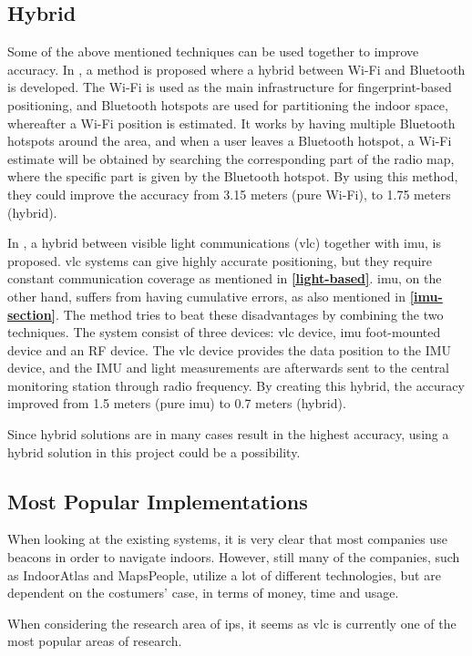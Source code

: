 \subsection{Hybrid}
Some of the above mentioned techniques can be used together to improve accuracy. In \cite{aauhybrid}, a method is proposed where a hybrid between Wi-Fi and Bluetooth is developed. The Wi-Fi is used as the main infrastructure for fingerprint-based positioning, and Bluetooth hotspots are used for partitioning the indoor space, whereafter a Wi-Fi position is estimated. It works by having multiple Bluetooth hotspots around the area, and when a user leaves a Bluetooth hotspot, a Wi-Fi estimate will be obtained by searching the corresponding part of the radio map, where the specific part is given by the Bluetooth hotspot. By using this method, they could improve the accuracy from 3.15 meters (pure Wi-Fi), to 1.75 meters (hybrid).

In \cite{9249516}, a hybrid between visible light communications (\gls{vlc}) together with \gls{imu}, is proposed. \gls{vlc} systems can give highly accurate positioning, but they require constant communication coverage as mentioned in \textbf{\ref{light-based}}. \gls{imu}, on the other hand, suffers from having cumulative errors, as also mentioned in \textbf{\ref{imu-section}}. The method tries to beat these disadvantages by combining the two techniques. The system consist of three devices: \gls{vlc} device, \gls{imu} foot-mounted device and an RF device. The \gls{vlc} device provides the data position to the IMU device, and the IMU and light measurements are afterwards sent to the central monitoring station through radio frequency. By creating this hybrid, the accuracy improved from 1.5 meters (pure \gls{imu}) to 0.7 meters (hybrid).

Since hybrid solutions are in many cases result in the highest accuracy, using a hybrid solution in this project could be a possibility.

\subsection{Most Popular Implementations}
When looking at the existing systems, it is very clear that most companies use beacons in order to navigate indoors\cite{IPSMapsPeople}. However, still many of the companies, such as IndoorAtlas and MapsPeople, utilize a lot of different technologies, but are dependent on the costumers' case, in terms of money, time and usage\cite{IndoorAtlas}.

When considering the research area of \gls{ips}, it seems as \gls{vlc} is currently one of the most popular areas of research.\cite{8911806, 8935876, 9170801, 9069785}